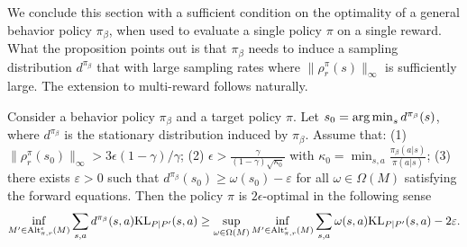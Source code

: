     We conclude this section with a sufficient condition on the optimality of a general behavior policy $\pi_\beta$, when used to evaluate a single policy $\pi$ on a single reward. What the proposition points out is that $\pi_\beta$ needs to induce a sampling distribution $d^{\pi_\beta}$ that with large sampling rates where $\|\rho_r^\pi(s)\|_\infty$ is sufficiently large. The extension to multi-reward follows naturally.
\begin{tcolorbox}
    \begin{proposition}
Consider a behavior policy $\pi_\beta$ and a target policy $\pi$.
Let $s_0=\operatorname*{arg\,min}_s d^{\pi_\beta}(s)$, where $d^{\pi_\beta}$ is the stationary distribution induced by ${\pi_\beta}$.
    Assume that: (1) $\|\rho_r^{\pi}(s_0)\|_\infty >3\epsilon(1-\gamma)/\gamma$; (2) $\epsilon>\frac{\gamma}{(1-\gamma)\sqrt{\kappa_0}}$ with $\kappa_0=\min_{s,a} \frac{\pi_\beta(a| s)}{\pi(a| s)}$; (3) there exists $\varepsilon >0$ such that  $d^{\pi_\beta}(s_0) \geq \omega(s_0)-\varepsilon$ for all $\omega\in \Omega(M)$ satisfying the forward equations. Then the policy $\pi$ is $2\epsilon$-optimal in the following sense
    \[
    \inf_{M'\in {\rm Alt}_{\pi,r}^\epsilon(M)}\sum_{s,a}d^{\pi_\beta}(s,a){\rm KL}_{P|P'}(s,a) \geq \sup_{\omega\in \Omega(M)}\inf_{M'\in {\rm Alt}_{\pi,r}^\epsilon(M)}\sum_{s,a}\omega(s,a){\rm KL}_{P|P'}(s,a)-2\varepsilon.
    \]
\end{proposition}
\end{tcolorbox}

